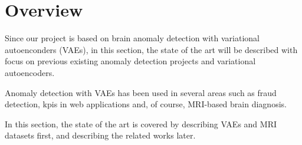 \section{Overview}

Since our project is based on brain anomaly detection with variational autoenconders (VAEs), in this section, the state of the art will be described with focus on previous existing anomaly detection projects and variational autoencoders.

Anomaly detection with VAEs has been used in several areas such as fraud detection, \Gls{kpi}s in web applications and, of course, MRI-based brain diagnosis.

In this section, the state of the art is covered by describing VAEs and MRI datasets first, and describing the related works later.